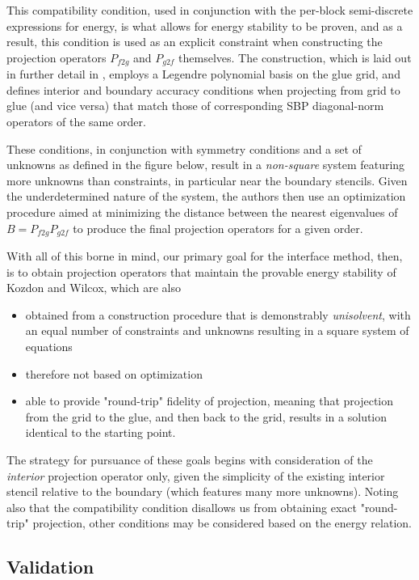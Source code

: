 This compatibility condition, used in conjunction with the per-block semi-discrete
expressions for energy, is what allows for energy stability to be proven, and
as a result, this condition is used as an explicit constraint when constructing the
projection operators $P_{f2g}$ and $P_{g2f}$ themselves. The construction, which is
laid out in further detail in \cite{kozdon2016stable}, employs a Legendre polynomial
basis on the glue grid, and defines interior and boundary accuracy conditions when
projecting from grid to glue (and vice versa) that match those of corresponding SBP
diagonal-norm operators of the same order.

These conditions, in conjunction with symmetry conditions and a set of unknowns as
defined in the figure below, result in a \emph{non-square} system featuring more
unknowns than constraints, in particular near the boundary stencils. Given the
underdetermined nature of the system, the authors then use an optimization procedure
aimed at minimizing the distance between the nearest eigenvalues of $B =
P_{f2g}P_{g2f}$ to produce the final projection operators for a given order.

With all of this borne in mind, our primary goal for the interface method, then,
is to obtain projection operators that maintain the provable energy stability
of Kozdon and Wilcox, which are also
\begin{itemize}
\item{obtained from a construction procedure that is demonstrably \emph{unisolvent},
      with an equal number of constraints and unknowns resulting in a square system
      of equations}
\item{therefore not based on optimization}
\item{able to provide "round-trip" fidelity of projection, meaning that projection
      from the grid to the glue, and then back to the grid, results in a solution
      identical to the starting point.}
\end{itemize}
The strategy for pursuance of these goals begins with consideration of the
\emph{interior} projection operator only, given the simplicity of the existing
interior stencil relative to the boundary (which features many more unknowns).
Noting also that the compatibility condition disallows us from obtaining
exact "round-trip" projection, other conditions may be considered based
on the energy relation.

\subsection{Validation}

